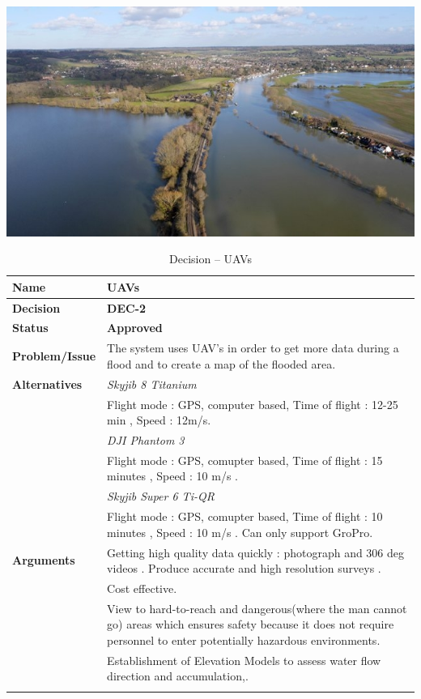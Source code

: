 \includegraphics[scale=0.5]{6-hardware/images/uavflood.jpg}
\begin{table}[h!]
\begin{tabular}{L{0.2\textwidth} L{0.6\textwidth}}

    \textbf{Name}           & \textbf{UAVs} \\ \toprule
    \textbf{Decision}       & \textbf{DEC-2}\\ \midrule
    \textbf{Status}         & \textbf{Approved} \\ \midrule
    \textbf{Problem/Issue}  & The system uses UAV's in order to get more data during a flood and to create a map of the flooded area. \\ \midrule
    \textbf{Alternatives}   & \textit{Skyjib 8 Titanium}\\
                            &  Flight mode : GPS, computer based, Time of flight :  12-25 min  , Speed : 12m/s.\\
                            & \textit {DJI Phantom 3}\\
                            & Flight mode : GPS, comupter based, Time of flight : 15 minutes , Speed : 10 m/s .\\
                            & \textit {Skyjib Super 6 Ti-QR}\\
                            & Flight mode : GPS, comupter based, Time of flight : 10 minutes , Speed : 10 m/s . Can only support GroPro.\\ 
                            \midrule
    \textbf{Arguments}     & Getting high quality data quickly : photograph and 306 deg videos . Produce accurate and high resolution surveys .\\
                           & Cost effective. \\ 
                           & View to hard-to-reach and dangerous(where the man cannot go) areas which ensures safety because it does not require personnel to enter potentially hazardous environments. \\                          
                           & Establishment of Elevation Models to assess water flow direction and accumulation,. \\ 
                           
                               

    \\ \bottomrule
\end{tabular}
\caption{Decision -- UAVs}
\label{table:linux}
\end{table}


